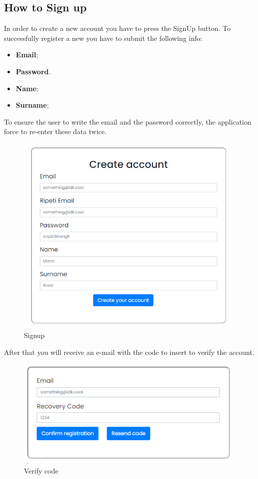 \subsection{How to Sign up} \label{_signup}
In order to create a new account you have to press the SignUp button. To successfully register a new you have to submit the following info:
\begin{itemize} 
    \item \textbf{Email};
    \item \textbf{Password}. 
    \item \textbf{Name};
    \item \textbf{Surname};
\end{itemize}
To ensure the user to write the email and the password correctly, the application force to re-enter these data twice.

\begin{figure}[H]
    \centering
    \includegraphics[width=30em]{res/images/cliente/signup.png}
    \caption{Signup}
\end{figure}

After that you will receive an e-mail with the code to insert to verify the account.

\begin{figure}[H]
    \centering
    \includegraphics[width=30em]{res/images/cliente/verify.png}
    \caption{Verify code}
\end{figure}


